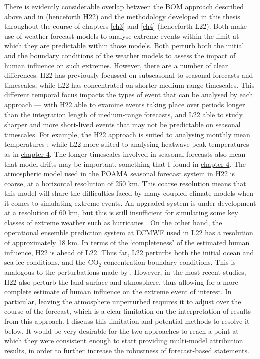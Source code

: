     There is evidently considerable overlap between the BOM approach described above and in \citet{hope_subseasonal_2022} (henceforth H22) and the methodology developed in this thesis throughout the course of chapters \ref{ch3} and \ref{ch4} (henceforth L22). Both make use of weather forecast models to analyse extreme events within the limit at which they are predictable within those models. Both perturb both the initial and the boundary conditions of the weather models to assess the impact of human influence on such extremes. However, there are a number of clear differences. H22 has previously focussed on subseasonal to seasonal forecasts and timescales, while L22 has concentrated on shorter medium-range timescales. This different temporal focus impacts the types of event that can be analysed by each approach --- with H22 able to examine events taking place over periods longer than the integration length of medium-range forecasts, and L22 able to study sharper and more short-lived events that may not be predictable on seasonal timescales. For example, the H22 approach is suited to analysing monthly mean temperatures \citep{hope_contributors_2015}; while L22 more suited to analysing heatwave peak temperatures as in \hyperref[ch4]{chapter 4}. The longer timescales involved in seasonal forecasts also mean that model drifts may be important, something that I found in \hyperref[ch4]{chapter 4}. The atmospheric model used in the POAMA seasonal forecast system in H22 is coarse, at a horizontal resolution of 250 km. This coarse resolution means that this model will share the difficulties faced by many coupled climate models when it comes to simulating extreme events. An upgraded system is under development at a resolution of 60 km, but this is still insufficient for simulating some key classes of extreme weather such as hurricanes \citep{hope_subseasonal_2022,patricola_anthropogenic_2018}. On the other hand, the operational ensemble prediction system at ECMWF used in L22 has a resolution of approximately 18 km. In terms of the `completeness' of the estimated human influence, H22 is ahead of L22. Thus far, L22 perturbs both the initial ocean and sea-ice conditions, and the CO$_2$ concentration boundary conditions. This is analogous to the perturbations made by \citet[][though they did not perturb the sea ice]{hope_contributors_2015}. However, in the most recent studies, H22 also perturb the land-surface and atmosphere, thus allowing for a more complete estimate of human influence on the extreme event of interest. In particular, leaving the atmosphere unperturbed requires it to adjust over the course of the forecast, which is a clear limitation on the interpretation of results from this approach. I discuss this limitation and potential methods to resolve it below. It would be very desirable for the two approaches to reach a point at which they were consistent enough to start providing multi-model attribution results, in order to further increase the robustness of forecast-based statements.


